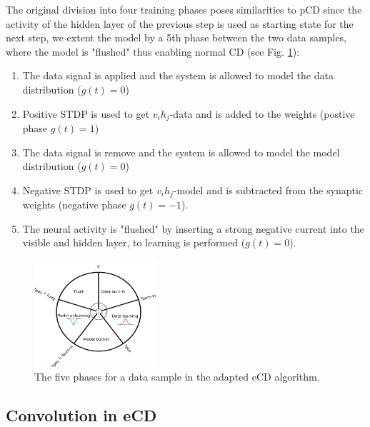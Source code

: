 The original division into four training phases poses similarities to pCD since the activity of the hidden layer of the previous step is used as starting state for the next step, we extent the model by a 5th phase between the two data samples, where the model is "flushed" thus enabling normal CD  (see Fig. \ref{fig:ecd5}):

\begin{enumerate}
\item The data signal is applied and the system is allowed to model the data distribution ($g(t)=0$)
\item Positive STDP is used to get $v_i h_j$-data and is added to the weights (postive phase $g(t)=1$)
\item The data signal is remove and the system is allowed to model the model distribution ($g(t)=0$)
\item Negative STDP is used to get $v_i h_j$-model and is subtracted from the synaptic weights (negative phase $g(t)=-1$).
\item The neural activity is "flushed" by inserting a strong negative current into the visible and hidden layer, to learning is performed ($g(t)=0$).
\end{enumerate}

\begin{figure}
	\centering
   	\includegraphics[width=0.4\textwidth]{imgs/eCD_5phases.png} 
    \caption{The five phases for a data sample in the adapted eCD algorithm. }
	\label{fig:ecd5}
\end{figure}

 
\subsection{Convolution in eCD} \label{c:ecdconv}

